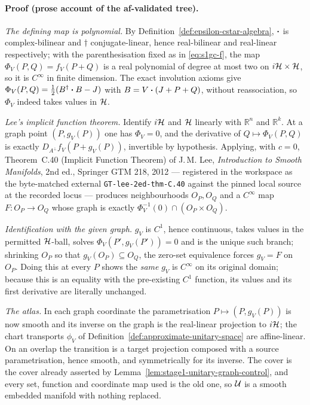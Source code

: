 \paragraph{Proof (prose account of the af-validated tree).}
\emph{The defining map is polynomial.} By Definition~\ref{def:epsilon-cstar-algebra},
$\mathbin{\bm{\cdot}}$ is complex-bilinear and $\dagger$ conjugate-linear, hence real-bilinear and
real-linear respectively; with the parenthesisation fixed as in \eqref{eq:s1gc-f}, the map
$\Phi_V(P,Q)=f_V(P+Q)$ is a real polynomial of degree at most two on
$i\mathcal H\times\mathcal H$, so it is $C^{\infty}$ in finite dimension. The exact involution axioms
give $\Phi_V(P,Q)=\tfrac12(B^{\dagger}\mathbin{\bm{\cdot}} B-J)$ with $B=V\mathbin{\bm{\cdot}}(J+P+Q)$, without reassociation,
so $\Phi_V$ indeed takes values in $\mathcal H$.

\emph{Lee's implicit function theorem.} Identify $i\mathcal H$ and $\mathcal H$ linearly with
$\mathbb R^{n}$ and $\mathbb R^{k}$. At a graph point $(P,g_V(P))$ one has $\Phi_V=0$, and
the derivative of $Q\mapsto\Phi_V(P,Q)$ is exactly $D_{A^{\perp}}f_V(P+g_V(P))$, invertible
by hypothesis. Applying, with $c=0$, Theorem~C.40 (Implicit Function Theorem) of J.\,M.
Lee, \emph{Introduction to Smooth Manifolds}, 2nd ed., Springer GTM 218, 2012 ---
registered in the workspace as the byte-matched external
\texttt{GT-lee-2ed-thm-C.40} against the pinned local source at the recorded locus ---
produces neighbourhoods $O_P,O_Q$ and a $C^{\infty}$ map $F:O_P\to O_Q$ whose graph is
exactly $\Phi_V^{-1}(0)\cap(O_P\times O_Q)$.

\emph{Identification with the given graph.} $g_V$ is $C^{1}$, hence continuous, takes values
in the permitted $\mathcal H$-ball, solves $\Phi_V(P',g_V(P'))=0$ and is the unique such branch;
shrinking $O_P$ so that $g_V(O_P)\subseteq O_Q$, the zero-set equivalence forces $g_V=F$ on
$O_P$. Doing this at every $P$ shows the \emph{same} $g_V$ is $C^{\infty}$ on its original
domain; because this is an equality with the pre-existing $C^{1}$ function, its values and
its first derivative are literally unchanged.

\emph{The atlas.} In each graph coordinate the parametrisation $P\mapsto(P,g_V(P))$ is now
smooth and its inverse on the graph is the real-linear projection to $i\mathcal H$; the chart
transports $\phi_V$ of Definition~\ref{def:approximate-unitary-space} are affine-linear. On
an overlap the transition is a target projection composed with a source parametrisation,
hence smooth, and symmetrically for its inverse. The cover is the cover already asserted by
Lemma~\ref{lem:stage1-unitary-graph-control}, and every set, function and coordinate map
used is the old one, so $\mathcal U$ is a smooth embedded manifold with nothing replaced.

